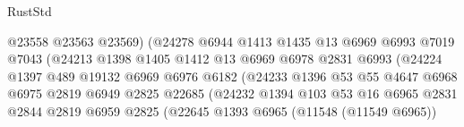 \begin{lexlean}{RustStd}
\begin{coremodule}
                                      @23558
                                      @23563
                                      @23569)
                                    (@24278
                                      @6944
                                      @1413
                                      @1435
                                      @13
                                      @6969
                                      @6993
                                      @7019
                                      @7043
                                      (@24213
                                        @1398
                                        @1405
                                        @1412
                                        @13
                                        @6969
                                        @6978
                                        @2831
                                        @6993
                                        (@24224
                                          @1397
                                          @489
                                          @19132
                                          @6969
                                          @6976
                                          @6182
                                          (@24233
                                            @1396
                                            @53
                                            @55
                                            @4647
                                            @6968
                                            @6975
                                            @2819
                                            @6949
                                            @2825
                                            @22685
                                            (@24232
                                              @1394
                                              @103
                                              @53
                                              @16
                                              @6965
                                              @2831
                                              @2844
                                              @2819
                                              @6959
                                              @2825
                                              (@22645
                                                @1393
                                                @6965
                                                (@11548 (@11549 @6965))

\end{coremodule}
\end{lexlean}
